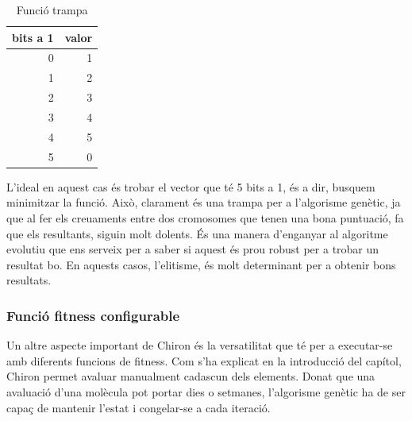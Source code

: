 
\begin{table}
\centering
\caption{Funció trampa}
\begin{tabular}{|r|r|}
\hline
\multicolumn{1}{|c|}{\textbf{bits a 1 }} & \multicolumn{1}{c|}{\textbf{ valor}} \\
\hline
\hline
0 & 1 \\
1 & 2 \\
2 & 3 \\
3 & 4 \\
4 & 5 \\
5 & 0 \\
\hline
\end{tabular}
\end{table}


L'ideal en aquest cas és trobar el vector que té 5 bits a 1, és a dir, busquem
minimitzar la funció.  Això, clarament és una trampa per a l'algorisme genètic,
ja que al fer els creuaments entre dos cromosomes que tenen una bona puntuació,
fa que els resultants, siguin molt dolents. És una manera d'enganyar al
algoritme evolutiu que ens serveix per a saber si aquest és prou robust per a
trobar un resultat bo.  En aquests casos, l'elitisme, és molt determinant per a
obtenir bons resultats.

\subsubsection{Funció fitness configurable} %
\label{ssub:Funcio fitness configurable}

Un altre aspecte important de Chiron és la versatilitat que té per a executar-se
amb diferents funcions de fitness.  Com s'ha explicat en la introducció del
capítol, Chiron permet avaluar manualment cadascun dels elements.  Donat que una
avaluació d'una molècula pot portar dies o setmanes, l'algorisme genètic ha de ser
capaç de mantenir l'estat i congelar-se a cada iteració.

